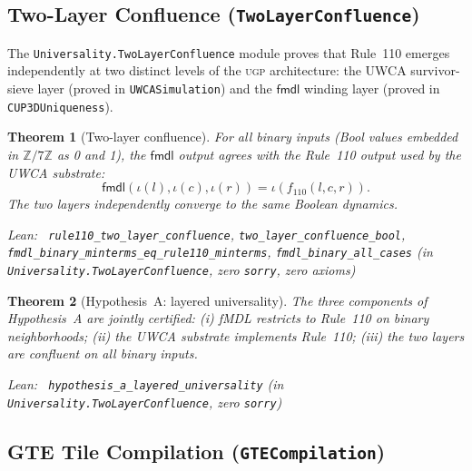 \documentclass[11pt,a4paper]{article}
\newenvironment{leanref}%
  {\par\smallskip\noindent\begingroup\raggedright\textup{Lean:}~}%
  {\par\endgroup}
\newtheorem{theorem}{Theorem}[section]
\theoremstyle{definition}
\newcommand{\ugp}{\textsc{ugp}}
\begin{document}
\subsection{Two-Layer Confluence (\texttt{TwoLayerConfluence})}\label{subsec:two-layer-confluence}

The \texttt{Universality.TwoLayerConfluence} module proves that Rule~110 emerges
independently at two distinct levels of the \ugp{} architecture: the UWCA
survivor-sieve layer (proved in \texttt{UWCASimulation}) and the $\mathsf{fmdl}$
winding layer (proved in \texttt{CUP3DUniqueness}).

\begin{theorem}[Two-layer confluence]\label{thm:two-layer-confluence}
For all binary inputs (Bool values embedded in $\mathbb{Z}/7\mathbb{Z}$ as 0 and 1),
the $\mathsf{fmdl}$ output agrees with the Rule~110 output used by the UWCA substrate:
\[
  \mathsf{fmdl}(\iota(l), \iota(c), \iota(r)) = \iota(f_{110}(l,c,r)).
\]
The two layers independently converge to the same Boolean dynamics.

\begin{leanref}
\lstinline|rule110_two_layer_confluence|,
\lstinline|two_layer_confluence_bool|,
\lstinline|fmdl_binary_minterms_eq_rule110_minterms|,
\lstinline|fmdl_binary_all_cases|
\textup{(in \texttt{Universality.TwoLayerConfluence}, zero \texttt{sorry}, zero axioms)}
\end{leanref}
\end{theorem}

\begin{theorem}[Hypothesis~A: layered universality]\label{thm:hypothesis-a}
The three components of Hypothesis~A are jointly certified: (i) fMDL restricts to
Rule~110 on binary neighborhoods; (ii) the UWCA substrate implements Rule~110;
(iii) the two layers are confluent on all binary inputs.

\begin{leanref}
\lstinline|hypothesis_a_layered_universality|
\textup{(in \texttt{Universality.TwoLayerConfluence}, zero \texttt{sorry})}
\end{leanref}
\end{theorem}

\subsection{GTE Tile Compilation (\texttt{GTECompilation})}\label{subsec:gte-compilation}
\end{document}
